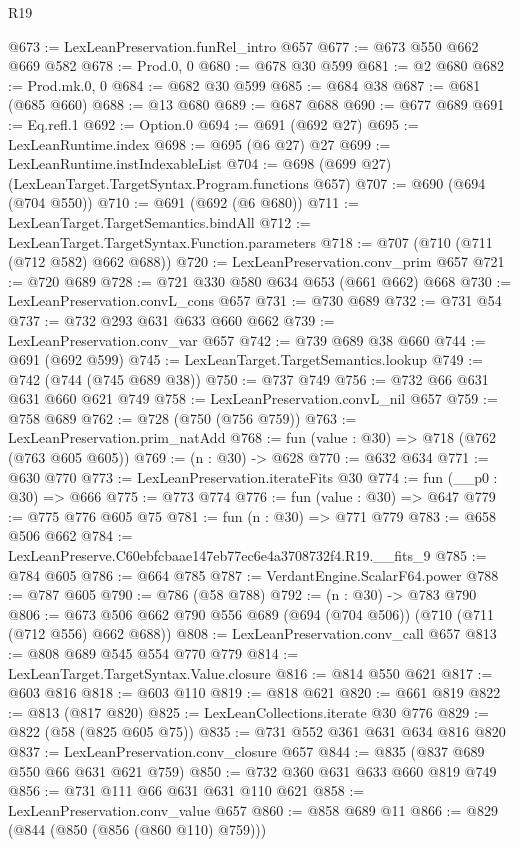 \begin{lexlean}{R19}
\begin{coremodule}
@673 := LexLeanPreservation.funRel_intro @657
@677 := @673 @550 @662 @669 @582
@678 := Prod.{0, 0}
@680 := @678 @30 @599
@681 := @2 @680
@682 := Prod.mk.{0, 0}
@684 := @682 @30 @599
@685 := @684 @38
@687 := @681 (@685 @660)
@688 := @13 @680
@689 := @687 @688
@690 := @677 @689
@691 := Eq.refl.{1}
@692 := Option.{0}
@694 := @691 (@692 @27)
@695 := LexLeanRuntime.index
@698 := @695 (@6 @27) @27
@699 := LexLeanRuntime.instIndexableList
@704 := @698 (@699 @27) (LexLeanTarget.TargetSyntax.Program.functions @657)
@707 := @690 (@694 (@704 @550))
@710 := @691 (@692 (@6 @680))
@711 := LexLeanTarget.TargetSemantics.bindAll
@712 := LexLeanTarget.TargetSyntax.Function.parameters
@718 := @707 (@710 (@711 (@712 @582) @662 @688))
@720 := LexLeanPreservation.conv_prim @657
@721 := @720 @689
@728 := @721 @330 @580 @634 @653 (@661 @662) @668
@730 := LexLeanPreservation.convL_cons @657
@731 := @730 @689
@732 := @731 @54
@737 := @732 @293 @631 @633 @660 @662
@739 := LexLeanPreservation.conv_var @657
@742 := @739 @689 @38 @660
@744 := @691 (@692 @599)
@745 := LexLeanTarget.TargetSemantics.lookup
@749 := @742 (@744 (@745 @689 @38))
@750 := @737 @749
@756 := @732 @66 @631 @631 @660 @621 @749
@758 := LexLeanPreservation.convL_nil @657
@759 := @758 @689
@762 := @728 (@750 (@756 @759))
@763 := LexLeanPreservation.prim_natAdd
@768 := fun (value : @30) => @718 (@762 (@763 @605 @605))
@769 := (n : @30) -> @628
@770 := @632 @634
@771 := @630 @770
@773 := LexLeanPreservation.iterateFits @30
@774 := fun (__p0 : @30) => @666
@775 := @773 @774
@776 := fun (value : @30) => @647
@779 := @775 @776 @605 @75
@781 := fun (n : @30) => @771 @779
@783 := @658 @506 @662
@784 := LexLeanPreserve.C60ebfcbaae147eb77ec6e4a3708732f4.R19.__fits_9
@785 := @784 @605
@786 := @664 @785
@787 := VerdantEngine.ScalarF64.power
@788 := @787 @605
@790 := @786 (@58 @788)
@792 := (n : @30) -> @783 @790
@806 := @673 @506 @662 @790 @556 @689 (@694 (@704 @506)) (@710 (@711 (@712 @556) @662 @688))
@808 := LexLeanPreservation.conv_call @657
@813 := @808 @689 @545 @554 @770 @779
@814 := LexLeanTarget.TargetSyntax.Value.closure
@816 := @814 @550 @621
@817 := @603 @816
@818 := @603 @110
@819 := @818 @621
@820 := @661 @819
@822 := @813 (@817 @820)
@825 := LexLeanCollections.iterate @30 @776
@829 := @822 (@58 (@825 @605 @75))
@835 := @731 @552 @361 @631 @634 @816 @820
@837 := LexLeanPreservation.conv_closure @657
@844 := @835 (@837 @689 @550 @66 @631 @621 @759)
@850 := @732 @360 @631 @633 @660 @819 @749
@856 := @731 @111 @66 @631 @631 @110 @621
@858 := LexLeanPreservation.conv_value @657
@860 := @858 @689 @11
@866 := @829 (@844 (@850 (@856 (@860 @110) @759)))

\end{coremodule}
\end{lexlean}
